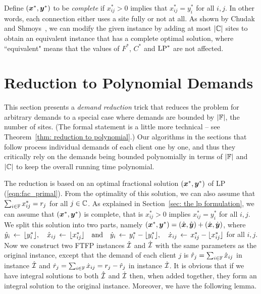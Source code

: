 \documentclass{llncs}
\begin{document}

Define $(\boldsymbol{x}^\ast, \boldsymbol{y}^\ast)$ to be \emph{complete} if
$x_{ij}^\ast>0$ implies that $x_{ij}^\ast=y_i^\ast$ for all
$i,j$. In other words, each connection either uses a site
fully or not at all.  As shown by Chudak and
Shmoys~\cite{ChudakS04}, we can modify the given instance by
adding at most $|\mathbb{C}|$ sites to obtain an equivalent
instance that has a complete optimal solution, where
``equivalent" means that the values of $F^\ast$, $C^\ast$ and
$\mbox{\rm LP}^\ast$ are not affected.

\section{Reduction to Polynomial Demands}
\label{sec: polynomial demands}

This section presents a \emph{demand reduction} trick that
reduces the problem for arbitrary demands to a special case
where demands are bounded by $|\mathbb{F}|$, the number of
sites.  (The formal statement is a little more technical --
see Theorem~\ref{thm: reduction to polynomial}.)  Our
algorithms in the sections that follow process individual
demands of each client one by one, and thus they critically
rely on the demands being bounded polynomially in terms of
$|\mathbb{F}|$ and $|\mathbb{C}|$ to keep the overall running time polynomial.

The reduction is based on an optimal fractional solution
$(\boldsymbol{x}^\ast,\boldsymbol{y}^\ast)$ of LP (\ref{eqn:fac_primal}). From the
optimality of this solution, we can also assume that
$\sum_{i\in\mathbb{F}} x^\ast_{ij} = r_j$ for all
$j\in\mathbb{C}$.  As explained in Section~\ref{sec: the lp
  formulation}, we can assume that $(\boldsymbol{x}^\ast,\boldsymbol{y}^\ast)$
is complete, that is $x^\ast_{ij} > 0$ implies $x^\ast_{ij}
= y^\ast_i$ for all $i,j$.  We split this solution into two
parts, namely $(\boldsymbol{x}^\ast,\boldsymbol{y}^\ast) = (\hat{\boldsymbol{x}},\hat{\boldsymbol{y}})+
(\dot{\boldsymbol{x}},\dot{\boldsymbol{y}})$, where
%
${\hat y}_i \;{\,\leftarrow\,}\; { \lfloor y_i^\ast \rfloor }, \quad
			{\hat x}_{ij} \;{\,\leftarrow\,}\; { \lfloor x_{ij}^\ast \rfloor } \quad\textrm{and}\quad
{\dot y}_i \;{\,\leftarrow\,}\; y_i^\ast - { \lfloor y_i^\ast \rfloor }, \quad
 	{\dot x}_{ij} \;{\,\leftarrow\,}\; x_{ij}^\ast -  { \lfloor x_{ij}^\ast \rfloor }
$
%
for all $i,j$. Now we construct two
FTFP instances ${\hat{\cal I}}$ and ${\dot{\cal I}}$ with the same
parameters as the original instance, except that the demand of each client $j$ is
${\hat r}_j = \sum_{i\in\mathbb{F}} {\hat x}_{ij}$ in instance ${\hat{\cal I}}$ and
${\dot r}_j = \sum_{i\in\mathbb{F}} {\dot x}_{ij} = r_j - {\hat r}_j$ in instance ${\dot{\cal I}}$. 
It is obvious that if we have integral solutions to both ${\hat{\cal I}}$
and ${\dot{\cal I}}$ then, when added together, they form an integral
solution to the original instance.  Moreover, we have the
following lemma.
\end{document}
